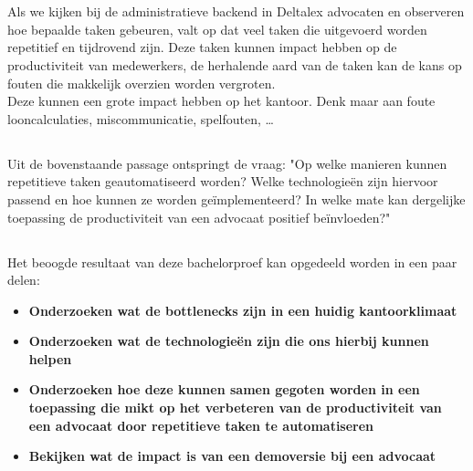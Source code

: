 \chapter{}

\section{}%
\label{sec:probleemstelling}

Als we kijken bij de administratieve backend in Deltalex advocaten en observeren hoe bepaalde taken gebeuren, valt op dat veel taken die uitgevoerd worden repetitief en tijdrovend zijn.
Deze taken kunnen impact hebben op de productiviteit van medewerkers, de herhalende aard van de taken kan de kans op fouten die makkelijk overzien worden vergroten. \\

Deze kunnen een grote impact hebben op het kantoor.
Denk maar aan foute looncalculaties, miscommunicatie, spelfouten, \dots


\section{}%
\label{sec:onderzoeksvraag}

Uit de bovenstaande passage ontspringt de vraag:
"Op welke manieren kunnen repetitieve taken geautomatiseerd worden?
Welke technologieën zijn hiervoor passend en hoe kunnen ze worden geïmplementeerd?
In welke mate kan dergelijke toepassing de productiviteit van een advocaat positief beïnvloeden?"

\newpage

\section{}%
\label{sec:onderzoeksdoelstelling}
Het beoogde resultaat van deze bachelorproef kan opgedeeld worden in een paar delen:
\begin{itemize}
	\item \textbf{Onderzoeken wat de bottlenecks zijn in een huidig kantoorklimaat}
	\item \textbf{Onderzoeken wat de technologieën zijn die ons hierbij kunnen helpen}
	\item \textbf{Onderzoeken hoe deze kunnen samen gegoten worden in een toepassing die mikt op het verbeteren van de productiviteit van een advocaat door repetitieve taken te automatiseren}
	\item \textbf{Bekijken wat de impact is van een demoversie bij een advocaat}
\end{itemize}

